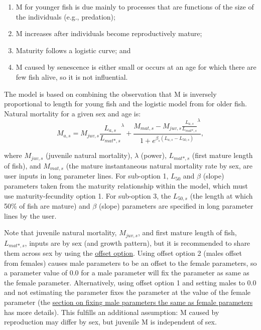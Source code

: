 \begin{enumerate}
  \item M for younger fish is due mainly to processes that are functions of the size of the individuals (e.g., predation);
  \item M increases after individuals become reproductively mature;
  \item Maturity follows a logistic curve; and
  \item M caused by senescence is either small or occurs at an age for which there are few fish alive, so it is not influential. 
\end{enumerate}
The model is based on combining the observation that M is inversely proportional to length for young fish \citep{lorenzen2000allometry} and the logistic model from \citet{lehodey2008spatial} for older fish. Natural mortality for a given sex and age is:
\begin{equation}
M_{a,s} = M_{juv,s}\frac{L_{a,s}}{L_{mat*,s}}^{\lambda} + 
\frac{M_{mat,s}-M_{juv,s}\frac{L_{a,s}}{L_{mat*,s}}^{\lambda}}{1+e^{\beta_s(L_{a,s}- L_{50,s})}},
\end{equation}

where $M_{juv,s}$ (juvenile natural mortality), $\lambda$ (power), $L_{mat*,s}$ (first mature length of fish), and $M_{mat,s}$ (the mature instantaneous natural mortality rate by sex, are user inputs in long parameter lines. For sub-option 1, $L_{50}$ and $\beta$ (slope) parameters taken from the maturity relationship within the model, which must use maturity-fecundity option 1. For sub-option 3, the $L_{50,s}$ (the length at which 50\% of fish are mature) and $\beta$ (slope) parameters are specified in long parameter lines by the user.

Note that juvenile natural mortality, $M_{juv,s}$, and first mature length of fish, $L_{mat*,s}$, inputs are by sex (and growth pattern), but it is recommended to share them across sex by using the \hyperlink{offset}{offset option}. Using offset option 2 (males offset from females) causes male parameters to be an offset to the female parameters, so a parameter value of 0.0 for a male parameter will fix the parameter as same as the female parameter. Alternatively, using offset option 1 and setting males to 0.0 and not estimating the parameter fixes the parameter at the value of the female parameter (the \hyperlink{male-shortcut}{section on fixing male parameters the same as female parameters} has more details). This fulfills an additional assumption: M caused by reproduction may differ by sex, but juvenile M is independent of sex.

